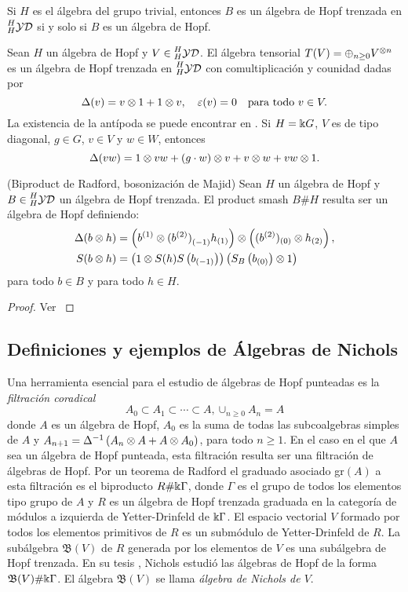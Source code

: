 \documentclass[a4paper,oneside,fleqn,11pt,../tesis.tex]{subfiles}
\newcommand{\yetter}{\prescript{H}{H}{\mathcal{YD}}}
\begin{document}
\begin{example}
	Si $H$ es el álgebra del grupo trivial, entonces $B$ es un álgebra de Hopf trenzada en $\yetter$ si y solo si $B$ es un álgebra de Hopf.
\end{example}

\begin{example} \label{exampletensoralgebra}
	Sean $H$ un álgebra de Hopf y $V \in \yetter$. El álgebra tensorial $T(V) = \oplus_{n \geq 0}V^{\otimes n}$ es un álgebra de Hopf trenzada en $\yetter$
	con comultiplicación y counidad dadas por
	\[
		\Delta(v) = v \otimes 1 + 1 \otimes v, \quad \varepsilon(v) = 0 \quad\text{para todo } v \in V.	
	\]
	La existencia de la antípoda se puede encontrar en \cite[5.2.10]{Mon}. Si $H = \Bbbk G$, $V$ es de tipo diagonal, $g \in G$, $v \in V$ y
	$w \in W$, entonces
	\[
		\Delta(vw) = 1 \otimes vw + (g \cdot w) \otimes v + v \otimes w + vw \otimes 1.
	\]
\end{example}

\begin{prop} (Biproduct de Radford, bosonización de Majid) Sean $H$ un álgebra de Hopf y $B \in \yetter$ un álgebra de Hopf trenzada.
	El product smash $B\#H$ resulta ser un álgebra de Hopf definiendo:
	\begin{align*}
		\Delta(b \otimes h) &= \left( b^{(1)}\otimes {(b^{(2)})}_{(-1)} h_{(1)} \right) \otimes \left( (b^{(2)})_{(0)} \otimes h_{(2)} \right),\\	
		S(b \otimes h) &= \left(1 \otimes S(h) S\left( b_{(-1)}\right) \right) \left(S_B\left(b_{(0)}\right) \otimes 1\right)
	\end{align*}
	para todo $b \in B$ y para todo $h \in H$.
\end{prop}
\begin{proof}
	Ver \cite{Ra}
\end{proof}

\subsection{Definiciones y ejemplos de Álgebras de Nichols}

Una herramienta esencial para el estudio de álgebras de Hopf punteadas es la \emph{filtración coradical}
\[
	A_0 \subset A_1 \subset \cdots \subset A, \cup_{n \geq 0}A_n = A
\]
donde $A$ es un álgebra de Hopf, $A_0$ es la suma de todas las subcoalgebras simples de $A$ y
$A_{n + 1} = \Delta^{-1}\left( A_n \otimes A + A \otimes A_0\right)$, para todo $n \geq 1$.
En el caso en el que $A$ sea un álgebra de Hopf punteada, esta filtración
resulta ser una filtración de álgebras de Hopf. Por un teorema de Radford \cite{Ra} el graduado
asociado gr$(A)$ a esta filtración es el biproducto $R\#\Bbbk\Gamma$, donde $\Gamma$ es el grupo de todos los elementos tipo
grupo de $A$ y $R$ es un álgebra de Hopf trenzada graduada en la categoría de módulos a izquierda de Yetter-Drinfeld  de $\Bbbk\Gamma$.
El espacio vectorial $V$ formado por todos los elementos primitivos de $R$ es un submódulo de Yetter-Drinfeld de $R$.
La subálgebra $\mathfrak{B}(V)$ de $R$ generada por los elementos de $V$ es una subálgebra de Hopf trenzada.
En su tesis \cite{Ni}, Nichols estudió las álgebras de Hopf de la forma $\mathfrak{B}(V) \# \Bbbk\Gamma$.
El álgebra $\mathfrak{B}(V)$ se llama \emph{álgebra de Nichols de $V$}.
\end{document}
